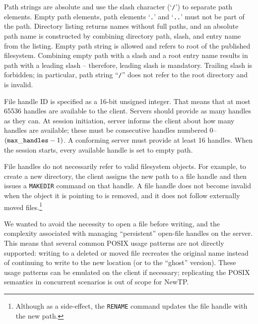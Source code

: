 Path strings are absolute and use the slash character (`{\tt /}') to separate path elements. Empty path
elements, path elements `{\tt .}' and `{\tt ..}' must not be part of the path. Directory listing returns names
without full paths, and an absolute path name is constructed by combining directory path, slash, and entry
name from the listing. Empty path string is allowed and refers to root of the published filesystem. Combining
empty path with a slash and a root entry name results in path with a leading slash -- therefore, leading slash
is mandatory. Trailing slash is forbidden; in particular, path string ``{\tt /}'' does not refer to the root
directory and is invalid.

File handle ID is specified as a 16-bit unsigned integer. That means that at most 65536 handles are available
to the client. Servers should provide as many handles as they can. At session initiation, server informs the
client about how many handles are available; these must be consecutive handles numbered 0--$({\tt max\_handles}
- 1)$. A conforming server must provide at least 16 handles. When the session starts, every available handle is
set to empty path.

File handles do not necessarily refer to valid filesystem objects. For example, to create a new directory,
the client assigns the new path to a file handle and then issues a {\tt MAKEDIR} command on that handle.
A file handle does not become invalid when the object it is pointing to is removed, and it does not follow
externally moved files.\footnote{Although as a side-effect, the {\tt RENAME} command updates the file handle
with the new path.}

We wanted to avoid the necessity to open a file before writing, and the complexity associated with managing
``persistent'' open-file handles on the server. This means that several common POSIX usage patterns are not
directly supported: writing to a deleted or moved file recreates the original name instead of continuing to
write to the new location (or to the ``ghost'' version). These usage patterns can be emulated on the client if
necessary; replicating the POSIX semantics in concurrent scenarios is out of scope for NewTP.

%

